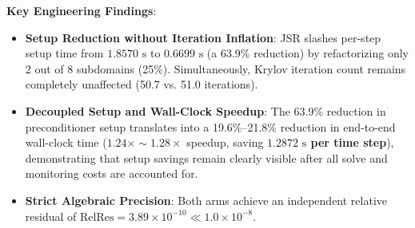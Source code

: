\documentclass[preprint,12pt,3p]{elsarticle}
\begin{document}
\begin{table}[htbp]
\centering
\small
\caption{Detailed execution breakdown of the Flagship $48^3$ Benchmark ($110,592$ DOFs, 8 subdomains, 3 steps).}
\label{tab:flagship48}
\end{table}

\textbf{Key Engineering Findings}:
\begin{itemize}
    \item \textbf{Setup Reduction without Iteration Inflation}: JSR slashes per-step setup time from $1.8570\text{ s}$ to $0.6699\text{ s}$ (a 63.9\% reduction) by refactorizing only 2 out of 8 subdomains (25\%). Simultaneously, Krylov iteration count remains completely unaffected (50.7 vs. 51.0 iterations).
    \item \textbf{Decoupled Setup and Wall-Clock Speedup}: The 63.9\% reduction in preconditioner setup translates into a 19.6\%--21.8\% reduction in end-to-end wall-clock time ($1.24\times \sim 1.28\times$ speedup, saving \textbf{$1.2872\text{ s}$ per time step}), demonstrating that setup savings remain clearly visible after all solve and monitoring costs are accounted for.
    \item \textbf{Strict Algebraic Precision}: Both arms achieve an independent relative residual of $\text{RelRes} = 3.89 \times 10^{-10} \ll 1.0 \times 10^{-8}$.
\end{itemize}
\end{document}
